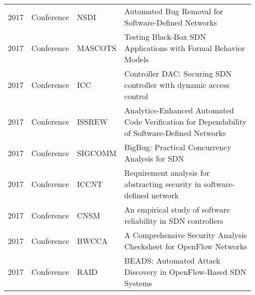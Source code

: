 \begin{appendices}
\begin{table}[ht!]
\begin{adjustbox}{width=\linewidth, center}
\begin{tabular}{llll}
2017          & Conference          & NSDI                         & Automated Bug Removal for Software-Defined Networks\citep{10.5555/3154630.3154688}                                                                                             \\
2017          & Conference          & MASCOTS                      & Testing Black-Box SDN Applications with Formal Behavior Models\citep{8107437}                                                                                                  \\
2017          & Conference          & ICC                          & Controller DAC: Securing SDN controller with dynamic access control\citep{7997249}                                                                                             \\
2017          & Conference          & ISSREW                       & Analytics-Enhanced Automated Code Verification for Dependability of Software-Defined Networks\citep{8109275}                                                                   \\
2017          & Conference          & SIGCOMM                      & BigBug: Practical Concurrency Analysis for SDN\citep{10.1145/3050220.3050230}                                                                                                  \\
2017          & Conference          & ICCNT                        & Requirement analysis for abstracting security in software-defined network\citep{8204161}                                                                                       \\
2017          & Conference          & CNSM                         & An empirical study of software reliability in SDN controllers\citep{8256002}                                                                                                   \\
2017          & Conference          & BWCCA                        & A Comprehensive Security Analysis Checksheet for OpenFlow Networks\citep{10.1007/978-3-319-49106-6_22}                                                                         \\
2017          & Conference          & RAID                         & BEADS: Automated Attack Discovery in OpenFlow-Based SDN Systems\citep{10.1007/978-3-319-66332-6_14}                                                                            \\

\end{tabular}
\end{adjustbox}
\end{table}
\end{appendices}
